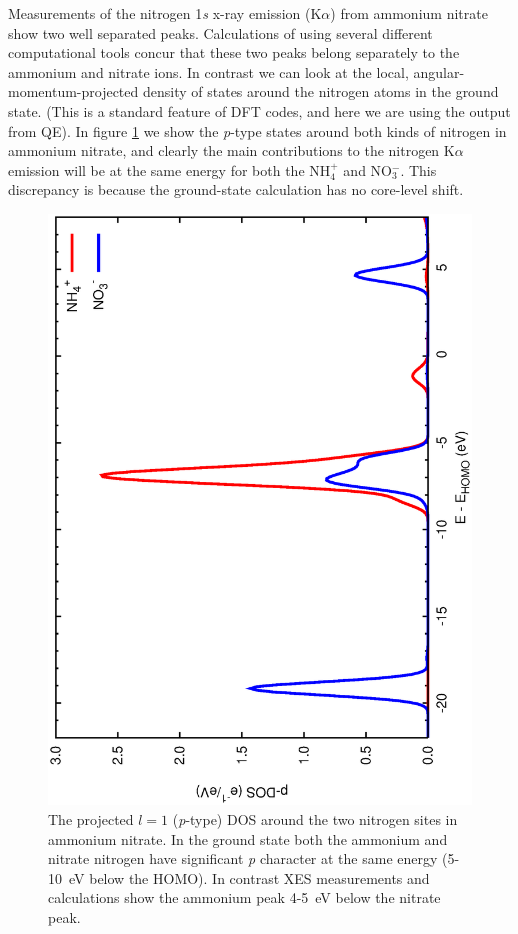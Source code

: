 \documentclass[11pt]{report}
\begin{document}
Measurements of the nitrogen 1{\it s} x-ray emission (K$\alpha$) from ammonium nitrate show two well separated peaks. Calculations of using several different computational tools concur that these two peaks belong separately to the ammonium and nitrate ions.\cite{ANpapers} 
In contrast we can look at the local, angular-momentum-projected density of states around the nitrogen atoms in the ground state. (This is a standard feature of DFT codes, and here we are using the output from QE). In figure \ref{an_pdos} we show the {\it p}-type states around both kinds of nitrogen in ammonium nitrate, and clearly the main contributions to the nitrogen K$\alpha$ emission will be at the same energy for both the NH$_4^+$ and NO$_3^-$. This discrepancy is because the ground-state calculation has no core-level shift.

\begin{figure}
\center
\includegraphics[angle=270,width=4.5in]{AN_pdos.eps}
\caption{ The projected $l=1$ ({\it p}-type) DOS around the two nitrogen sites in ammonium nitrate. In the ground state both the ammonium and nitrate nitrogen have significant {\it p} character at the same energy (5-10~eV below the HOMO). In contrast XES measurements and calculations show the ammonium peak 4-5~eV below the nitrate peak. }
\label{an_pdos}
\end{figure}
\end{document}
